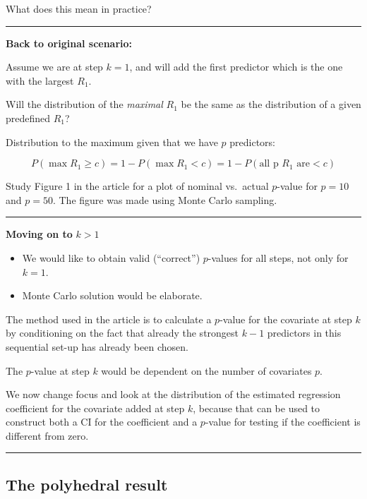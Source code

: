 \documentclass[
  letterpaper,
  DIV=11,
  numbers=noendperiod]{scrartcl}
\providecommand{\tightlist}{%
  \setlength{\itemsep}{0pt}\setlength{\parskip}{0pt}}\usepackage{longtable,booktabs,array}
\begin{document}
What does this mean in practice?

\begin{center}\rule{0.5\linewidth}{0.5pt}\end{center}

\textbf{Back to original scenario:}

Assume we are at step \(k=1\), and will add the first predictor which is
the one with the largest \(R_1\).

Will the distribution of the \emph{maximal} \(R_1\) be the same as the
distribution of a given predefined \(R_1\)?

Distribution to the maximum given that we have \(p\) predictors:

\[ P(\max R_1 \ge c)=1-P(\max R_1 < c)=1-P(\text{all p } R_1 \text{ are} <c)\]

Study Figure 1 in the article for a plot of nominal vs.~actual
\(p\)-value for \(p=10\) and \(p=50\). The figure was made using Monte
Carlo sampling.

\begin{center}\rule{0.5\linewidth}{0.5pt}\end{center}

\textbf{Moving on to} \(k>1\)

\begin{itemize}
\tightlist
\item
  We would like to obtain valid (``correct'') \(p\)-values for all
  steps, not only for \(k=1\).
\item
  Monte Carlo solution would be elaborate.
\end{itemize}

The method used in the article is to calculate a \(p\)-value for the
covariate at step \(k\) by conditioning on the fact that already the
strongest \(k-1\) predictors in this sequential set-up has already been
chosen.

The \(p\)-value at step \(k\) would be dependent on the number of
covariates \(p\).

We now change focus and look at the distribution of the estimated
regression coefficient for the covariate added at step \(k\), because
that can be used to construct both a CI for the coefficient and a
\(p\)-value for testing if the coefficient is different from zero.

\begin{center}\rule{0.5\linewidth}{0.5pt}\end{center}

\hypertarget{the-polyhedral-result}{%
\subsection{The polyhedral result}\label{the-polyhedral-result}}
\end{document}
